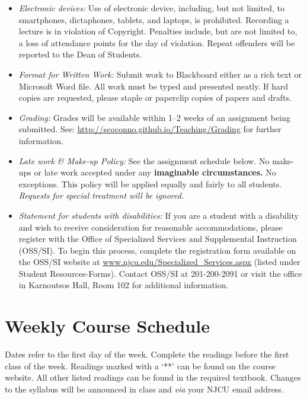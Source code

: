 \documentclass[article,oneside]{memoir}
\begin{document}
\begin{itemize}
\item \textit{Electronic devices:} Use of electronic device, including, but not limited, to smartphones, dictaphones, tablets, and laptops, is prohibited. Recording a lecture is in violation of Copyright. Penalties include, but are not limited to, a loss of attendance points for the day of violation. Repeat offenders will be reported to the Dean of Students.

\item \textit{Format for Written Work:} Submit work to Blackboard either as a rich text or Microsoft Word file. All work must be typed and presented neatly. If hard copies are requested, please staple or paperclip copies of papers and drafts.



\item \textit{Grading:} Grades will be available within 1--2 weeks of an assignment being submitted. See: \href{http://scoconno.github.io/Teaching/Grading}{http://scoconno.github.io/Teaching/Grading} for further information.


\item \textit{Late work \& Make-up Policy:} See the assignment schedule below. No make-ups or late work accepted under any \textbf{imaginable circumstances.} No exceptions. This policy will be applied equally and fairly to all students. \emph{Requests for special treatment will be ignored.}


\item \textit{Statement for students with disabilities:} If you are a student with a disability and wish to receive consideration for reasonable accommodations, please register with the Office of Specialized Services and Supplemental Instruction (OSS/SI). To begin this process, complete the registration form available on the OSS/SI website at
\href{http://www.njcu.edu/Specialized_Services.aspx}{www.njcu.edu/Specialized\_Services.aspx}
(listed under Student Resources-Forms). Contact OSS/SI at 201-200-2091
or visit the office in Karnoutsos Hall, Room 102 for additional
information.

\end{itemize}



\section{Weekly Course Schedule}
Dates refer to the first day of the week. Complete the readings before the first class of the week. Readings marked with a `**' can be found on the course website. All other listed readings can be found in the required textbook. Changes to the syllabus will be announced in class and \emph{via} your NJCU email address.
\end{document}
